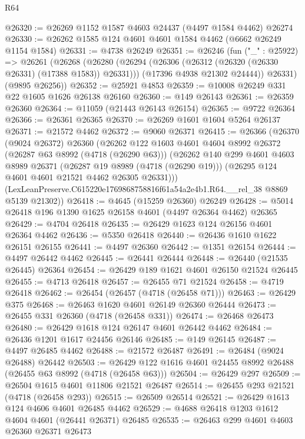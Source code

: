 \begin{lexlean}{R64}
\begin{coremodule}
@26320 := @26269 @1152 @1587 @4603 @24437 (@4497 @1584 @4462) @26274
@26330 := @26262 @1585 @124 @4601 @4601 @1584 @4462 (@6662 @26249 @1154 @1584)
@26331 := @4738 @26249
@26351 := @26246
    (fun ("_" : @25922) =>
    @26261
      (@26268
        (@26280
          (@26294 (@26306 (@26312 (@26320 (@26330 @26331) (@17388 @1583)) @26331)))
          (@17396 @4938 @21302 @24444))
        @26331)
      (@9895 @26256))
@26352 := @25921 @4853
@26359 := @10008 @26249 @331 @22 @1605 @1626 @26138 @26160
@26360 := @149 @26143
@26361 := @26359 @26360
@26364 := @11059 (@21443 @26143 @26154)
@26365 := @9722 @26364
@26366 := @26361 @26365
@26370 := @26269 @1601 @1604 @5264 @26137
@26371 := @21572 @4462
@26372 := @9060 @26371
@26415 := @26366
    (@26370
      (@9024 @26372)
      @26360
      (@26262
        @122
        @1603
        @4601
        @4604
        @8992
        @26372
        (@26287 @63 @8992 (@4718 (@26290 @63)))
        (@26262
          @140
          @299
          @4601
          @4603
          @8989
          @26371
          (@26287 @19 @8989 (@4718 (@26290 @19)))
          (@26295 @124 @4601 @4601 @21521 @4462 @26305 @26331)))
      (LexLeanPreserve.C615220e1769868758816f61a54a2e4b1.R64.__rel_38 @8869 @5139 @21302))
@26418 := @4645 (@15259 @26360) @26249
@26428 := @5014 @26418 @196 @1390 @1625 @26158 @4601 (@4497 @26364 @4462) @26365
@26429 := @4704 @26418
@26435 := @26429 @1623 @124 @26156 @4601 @26364 @4462
@26436 := @5350 @26418
@26440 := @26436 @1610 @1622 @26151 @26155
@26441 := @4497 @26360
@26442 := @1351 @26154
@26444 := @4497 @26442 @4462
@26445 := @26441 @26444
@26448 := @26440 (@21535 @26445) @26364
@26454 := @26429 @189 @1621 @4601 @26150 @21524 @26445
@26455 := @4713 @26418
@26457 := @26455 @71 @21524
@26458 := @4719 @26418
@26462 := @26454 (@26457 (@4718 (@26458 @71)))
@26463 := @26429 @375
@26468 := @26463 @1620 @4601 @26149 @26360 @26444
@26473 := @26455 @331 @26360 (@4718 (@26458 @331))
@26474 := @26468 @26473
@26480 := @26429 @1618 @124 @26147 @4601 @26442 @4462
@26484 := @26436 @1201 @1617 @24456 @26146
@26485 := @149 @26145
@26487 := @4497 @26485 @4462
@26488 := @21572 @26487
@26491 := @26484 (@9024 @26488) @26442
@26503 := @26429 @122 @1616 @4601 @24455 @8992 @26488 (@26455 @63 @8992 (@4718 (@26458 @63)))
@26504 := @26429 @297
@26509 := @26504 @1615 @4601 @11806 @21521 @26487
@26514 := @26455 @293 @21521 (@4718 (@26458 @293))
@26515 := @26509 @26514
@26521 := @26429 @1613 @124 @4606 @4601 @26485 @4462
@26529 := @4688 @26418 @1203 @1612 @4604 @4601 (@26441 @26371) @26485
@26535 := @26463 @299 @4601 @4603 @26360 @26371 @26473

\end{coremodule}
\end{lexlean}
